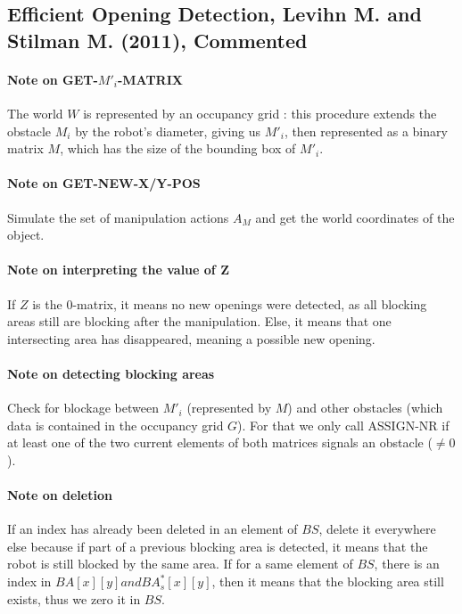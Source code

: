 \subsection{Efficient Opening Detection, Levihn M. and Stilman M. (2011), Commented}\label{eod_section}

\paragraph{Note on GET-$M'_{i}$-MATRIX}\label{get_mi_matrix_note} The world $W$ is represented by an occupancy grid : this procedure extends the obstacle $M_{i}$ by the robot's diameter, giving us $M'_{i}$, then represented as a binary matrix $M$, which has the size of the bounding box of $M'_{i}$.

\paragraph{Note on GET-NEW-X/Y-POS}\label{x-y-pos_note} Simulate the set of manipulation actions $A_{M}$ and get the world coordinates of the object.

\paragraph{Note on interpreting the value of Z}\label{interpreting_z_note} If $Z$ is the 0-matrix, it means no new openings were detected, as all blocking areas still are blocking after the manipulation. Else, it means that one intersecting area has disappeared, meaning a possible new opening.

\paragraph{Note on detecting blocking areas}\label{check_blockage_note} Check for blockage between $M'_{i}$ (represented by $M$) and other obstacles (which data is contained in the occupancy grid $G$). For that we only call ASSIGN-NR if at least one of the two current elements of both matrices signals an obstacle ($\neq 0$).

\paragraph{Note on deletion}\label{deletion_note} If an index has already been deleted in an element of $BS$, delete it everywhere else because if part of a previous blocking area is detected, it means that the robot is still blocked by the same area. If for a same element of $BS$, there is an index in $BA[x][y] and BA^*_{s}[x][y]$, then it means that the blocking area still exists, thus we zero it in $BS$.



\clearpage



